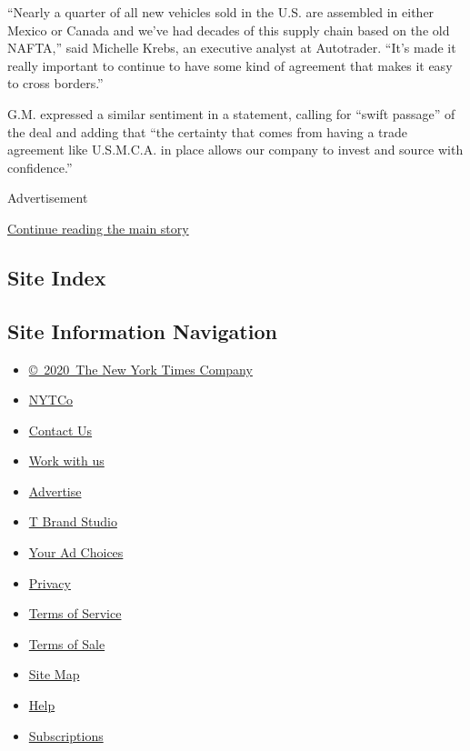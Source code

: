 ``Nearly a quarter of all new vehicles sold in the U.S. are assembled in
either Mexico or Canada and we've had decades of this supply chain based
on the old NAFTA,'' said Michelle Krebs, an executive analyst at
Autotrader. ``It's made it really important to continue to have some
kind of agreement that makes it easy to cross borders.''

G.M. expressed a similar sentiment in a statement, calling for ``swift
passage'' of the deal and adding that ``the certainty that comes from
having a trade agreement like U.S.M.C.A. in place allows our company to
invest and source with confidence.''

Advertisement

\protect\hyperlink{after-bottom}{Continue reading the main story}

\hypertarget{site-index}{%
\subsection{Site Index}\label{site-index}}

\hypertarget{site-information-navigation}{%
\subsection{Site Information
Navigation}\label{site-information-navigation}}

\begin{itemize}
\tightlist
\item
  \href{https://help.nytimes.com/hc/en-us/articles/115014792127-Copyright-notice}{©~2020~The
  New York Times Company}
\end{itemize}

\begin{itemize}
\tightlist
\item
  \href{https://www.nytco.com/}{NYTCo}
\item
  \href{https://help.nytimes.com/hc/en-us/articles/115015385887-Contact-Us}{Contact
  Us}
\item
  \href{https://www.nytco.com/careers/}{Work with us}
\item
  \href{https://nytmediakit.com/}{Advertise}
\item
  \href{http://www.tbrandstudio.com/}{T Brand Studio}
\item
  \href{https://www.nytimes.com/privacy/cookie-policy\#how-do-i-manage-trackers}{Your
  Ad Choices}
\item
  \href{https://www.nytimes.com/privacy}{Privacy}
\item
  \href{https://help.nytimes.com/hc/en-us/articles/115014893428-Terms-of-service}{Terms
  of Service}
\item
  \href{https://help.nytimes.com/hc/en-us/articles/115014893968-Terms-of-sale}{Terms
  of Sale}
\item
  \href{https://spiderbites.nytimes.com}{Site Map}
\item
  \href{https://help.nytimes.com/hc/en-us}{Help}
\item
  \href{https://www.nytimes.com/subscription?campaignId=37WXW}{Subscriptions}
\end{itemize}
